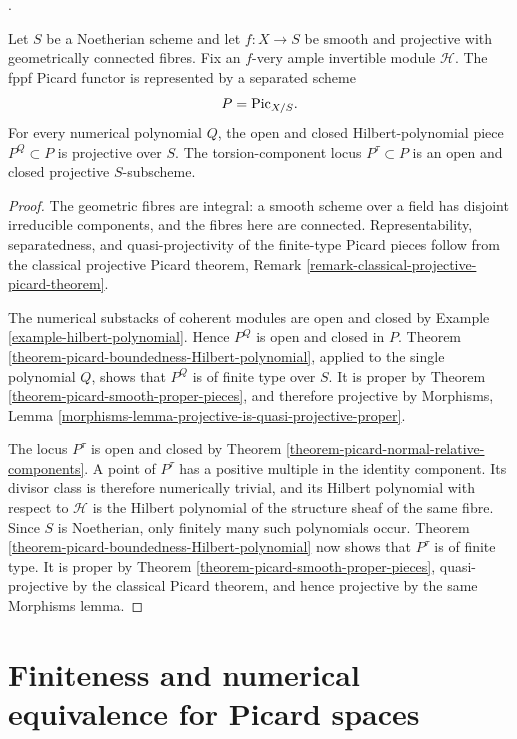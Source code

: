 \begin{lemma}
\label{corollary-picard-Hilbert-torsion-projective}
\begin{reference}
\cite[Expos\'e 236, Corollary 4.2, p. 243]{FGA}.
\end{reference}
Let $S$ be a Noetherian scheme and let $f:X\to S$ be smooth and projective
with geometrically connected fibres. Fix an $f$-very ample invertible module
$\mathcal{H}$. The fppf Picard functor is represented by a separated scheme
$$
P=\mathrm{Pic}_{X/S}.
$$
For every numerical polynomial $Q$, the open and closed Hilbert-polynomial
piece $P^Q\subset P$ is projective over $S$. The torsion-component locus
$P^\tau\subset P$ is an open and closed projective $S$-subscheme.
\end{lemma}

\begin{proof}
The geometric fibres are integral: a smooth scheme over a field has disjoint
irreducible components, and the fibres here are connected. Representability,
separatedness, and quasi-projectivity of the finite-type Picard pieces follow
from the classical projective Picard theorem, Remark
\ref{remark-classical-projective-picard-theorem}.

The numerical substacks of coherent modules are open and closed by Example
\ref{example-hilbert-polynomial}. Hence $P^Q$ is open and closed in $P$.
Theorem \ref{theorem-picard-boundedness-Hilbert-polynomial}, applied to the
single polynomial $Q$, shows that $P^Q$ is of finite type over $S$. It is
proper by Theorem \ref{theorem-picard-smooth-proper-pieces}, and therefore
projective by Morphisms, Lemma
\ref{morphisms-lemma-projective-is-quasi-projective-proper}.

The locus $P^\tau$ is open and closed by Theorem
\ref{theorem-picard-normal-relative-components}. A point of $P^\tau$ has a
positive multiple in the identity component. Its divisor class is therefore
numerically trivial, and its Hilbert polynomial with respect to $\mathcal H$
is the Hilbert polynomial of the structure sheaf of the same fibre. Since
$S$ is Noetherian, only finitely many such polynomials occur. Theorem
\ref{theorem-picard-boundedness-Hilbert-polynomial} now shows that
$P^\tau$ is of finite type. It is proper by Theorem
\ref{theorem-picard-smooth-proper-pieces}, quasi-projective by the classical
Picard theorem, and hence projective by the same Morphisms lemma.
\end{proof}

\section{Finiteness and numerical equivalence for Picard spaces}
\label{section-picard-finiteness-numerical}

